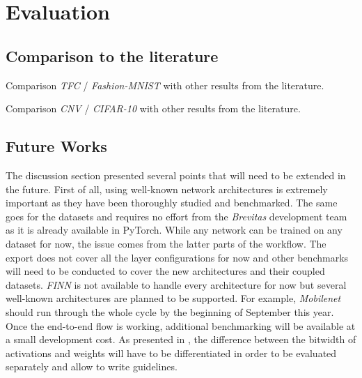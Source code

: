 
\section{Evaluation}


\subsection{Comparison to the literature}

Comparison \emph{TFC} / \emph{Fashion-MNIST} with other results from the literature.

Comparison \emph{CNV} / \emph{CIFAR-10} with other results from the literature.

\subsection{Future Works}

The discussion section presented several points that will need to be extended in the future. First of all, using well-known network architectures is extremely important as they have been thoroughly studied and benchmarked. The same goes for the datasets and requires no effort from the \emph{Brevitas} development team as it is already available in PyTorch. While any network can be trained on any dataset for now, the issue comes from the latter parts of the workflow. The export does not cover all the layer configurations for now and other benchmarks will need to be conducted to cover the new architectures and their coupled datasets. \emph{FINN} is not available to handle every architecture for now but several well-known architectures are planned to be supported. For example, \emph{Mobilenet} should run through the whole cycle by the beginning of September this year. Once the end-to-end flow is working, additional benchmarking will be available at a small development cost. As presented in \cite{Bacchus2020}, the difference between the bitwidth of activations and weights will have to be differentiated in order to be evaluated separately and allow to write guidelines.

